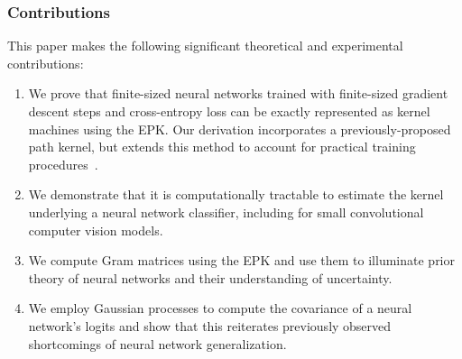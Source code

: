   \begin{frame}
    \frametitle{Contributions}
 This paper makes the following significant theoretical and experimental contributions:
 \begin{enumerate}
     \item We prove that finite-sized neural networks trained with finite-sized gradient descent steps and cross-entropy loss can be exactly represented as kernel machines using the EPK. Our derivation incorporates a previously-proposed path kernel, but extends this method to account for practical training procedures~\cite{domingos2020every, chen2021equivalence}.
  
     \item We demonstrate that it is computationally tractable to estimate the kernel underlying a neural network classifier, including for small convolutional computer vision models.
     \item We compute Gram matrices using the EPK and use them to illuminate prior theory of neural networks and their understanding of uncertainty. 
     \item We employ Gaussian processes to compute the covariance of a neural network's logits and show that this reiterates previously observed shortcomings of neural network generalization.
 \end{enumerate}
\end{frame}

